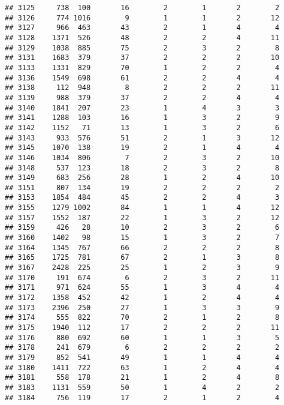 \documentclass[]{article}
\begin{document}
\begin{verbatim}
## 3125     738  100       16        2        1       2        2
## 3126     774 1016        9        1        1       2       12
## 3127     966  463       43        2        1       4        4
## 3128    1371  526       48        2        2       4       11
## 3129    1038  885       75        2        3       2        8
## 3131    1683  379       37        2        2       2       10
## 3133    1331  829       70        1        2       2        4
## 3136    1549  698       61        2        2       4        4
## 3138     112  948        8        2        2       2       11
## 3139     988  379       37        2        2       4        4
## 3140    1841  207       23        1        4       3        3
## 3141    1288  103       16        1        3       2        9
## 3142    1152   71       13        1        3       2        6
## 3143     933  576       51        2        1       3       12
## 3145    1070  138       19        2        1       4        4
## 3146    1034  806        7        2        3       2       10
## 3148     537  123       18        2        3       2        8
## 3149     683  256       28        1        2       4       10
## 3151     807  134       19        2        2       2        2
## 3153    1854  484       45        2        2       4        3
## 3155    1279 1002       84        1        1       4       12
## 3157    1552  187       22        1        3       2       12
## 3159     426   28       10        2        3       2        6
## 3160    1402   98       15        1        3       2        7
## 3164    1345  767       66        2        2       2        8
## 3165    1725  781       67        2        1       3        8
## 3167    2428  225       25        1        2       3        9
## 3170     191  674        6        2        3       2       11
## 3171     971  624       55        1        3       4        4
## 3172    1358  452       42        1        2       4        4
## 3173    2396  250       27        1        3       3        9
## 3174     555  822       70        2        1       2        8
## 3175    1940  112       17        2        2       2       11
## 3176     880  692       60        1        1       3        5
## 3178     241  679        6        2        2       2        2
## 3179     852  541       49        1        1       4        4
## 3180    1411  722       63        1        2       4        4
## 3181     558  178       21        1        2       4        8
## 3183    1131  559       50        1        4       2        2
## 3184     756  119       17        2        1       2        4

\end{verbatim}
\end{document}
